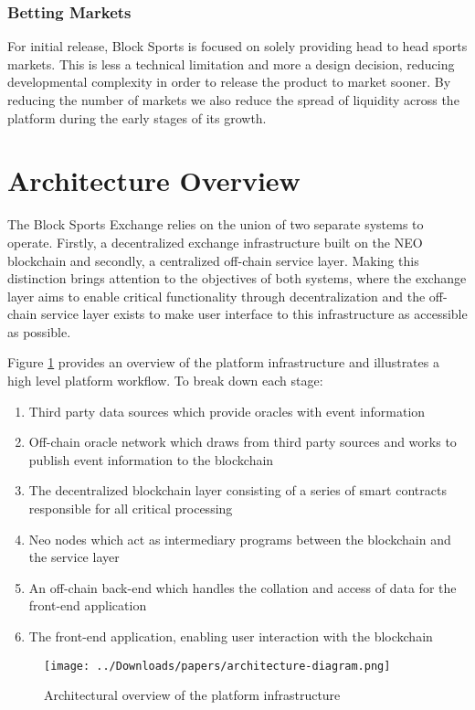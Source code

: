 \documentclass{article}
\begin{document}
		\subsubsection{Betting Markets}
For initial release, Block Sports is focused on solely providing head to head sports markets. This is less a technical limitation and more a design decision, reducing developmental complexity in order to release the product to market sooner. By reducing the number of markets we also reduce the spread of liquidity across the platform during the early stages of its growth.

\section{Architecture Overview}
The Block Sports Exchange relies on the union of two separate systems to operate. Firstly, a decentralized exchange infrastructure built on the NEO blockchain and secondly, a centralized  off-chain service layer. Making this distinction brings attention to the objectives of both systems, where the exchange layer aims to enable critical functionality through decentralization and the off-chain service layer exists to make user interface to this infrastructure as accessible as possible.

Figure \ref{figure:architecture} provides an overview of the platform infrastructure and illustrates a high level platform workflow. To break down each stage:
\begin{enumerate}[label=(\alph*)]
	\item Third party data sources which provide oracles with event information
	\item Off-chain oracle network which draws from third party sources and works to publish event information to the blockchain
	\item The decentralized blockchain layer consisting of a series of smart contracts responsible for all critical processing
	\item Neo nodes which act as intermediary programs between the blockchain and the service layer
	\item An off-chain back-end which handles the collation and access of data for the front-end application
	\item The front-end application, enabling user interaction with the blockchain
\end{enumerate}

\begin{figure}[!htb]
\centering
\texttt{[image: ../Downloads/papers/architecture-diagram.png]}
\caption{Architectural overview of the platform infrastructure}
\label{figure:architecture}
\end{figure}
\end{document}
